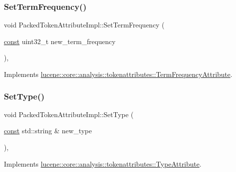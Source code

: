 \subsubsection{\texorpdfstring{Set\+Term\+Frequency()}{SetTermFrequency()}}
{\footnotesize\ttfamily void Packed\+Token\+Attribute\+Impl\+::\+Set\+Term\+Frequency (\begin{DoxyParamCaption}\item[{\mbox{\hyperlink{ZlibCrc32_8h_a2c212835823e3c54a8ab6d95c652660e}{const}} uint32\+\_\+t}]{new\+\_\+term\+\_\+frequency }\end{DoxyParamCaption})\hspace{0.3cm}{\ttfamily [override]}, {\ttfamily [virtual]}}



Implements \mbox{\hyperlink{classlucene_1_1core_1_1analysis_1_1tokenattributes_1_1TermFrequencyAttribute_aeb8ef8cc3f3ab6c8678b491ac3e1b682}{lucene\+::core\+::analysis\+::tokenattributes\+::\+Term\+Frequency\+Attribute}}.

\mbox{\label{classlucene_1_1core_1_1analysis_1_1tokenattributes_1_1PackedTokenAttributeImpl_ad5f1b7e5437154dada3da8cc4f89c642}} 
\subsubsection{\texorpdfstring{Set\+Type()}{SetType()}}
{\footnotesize\ttfamily void Packed\+Token\+Attribute\+Impl\+::\+Set\+Type (\begin{DoxyParamCaption}\item[{\mbox{\hyperlink{ZlibCrc32_8h_a2c212835823e3c54a8ab6d95c652660e}{const}} std\+::string \&}]{new\+\_\+type }\end{DoxyParamCaption})\hspace{0.3cm}{\ttfamily [override]}, {\ttfamily [virtual]}}



Implements \mbox{\hyperlink{classlucene_1_1core_1_1analysis_1_1tokenattributes_1_1TypeAttribute_abb4ecef2fd30c7b659efd7f3a2086945}{lucene\+::core\+::analysis\+::tokenattributes\+::\+Type\+Attribute}}.

